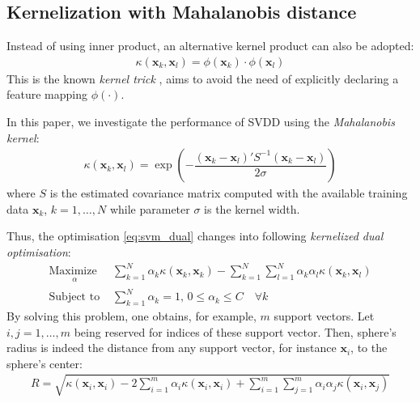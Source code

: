 \documentclass[conference]{IEEEtran}
\theoremstyle{problemstyle}
\begin{document}
\subsection{Kernelization with Mahalanobis distance}

Instead of using inner product, an alternative kernel product can also be adopted:
\begin{align}
\kappa \left( \mathbf{x}_k, \mathbf{x}_l \right) = \phi \left( \mathbf{x}_k \right) \cdot \phi \left( \mathbf{x}_l \right)
\end{align}
This is the known \emph{kernel trick} \cite{Scholkopf2001}, aims to avoid the need of explicitly declaring a feature mapping $\phi \left( \cdot \right)$. 

In this paper, we investigate the performance of SVDD using the \emph{Mahalanobis kernel}:
\begin{align}
\kappa \left( \mathbf{x}_k, \mathbf{x}_l \right) = \exp \left( -\dfrac{ \left( \mathbf{x}_k - \mathbf{x}_l \right)'S^{-1}\left( \mathbf{x}_k - \mathbf{x}_l \right) }{2\sigma} \right)
\end{align}
where $S$ is the estimated covariance matrix computed with the available training data $\mathbf{x}_k$, $k=1,\dots,N$ while parameter $\sigma$ is the kernel width. 

Thus, the optimisation \eqref{eq:svm_dual} changes into following \emph{kernelized dual optimisation}:
\begin{subequations}\label{eq:svm_dual_kernel}
\begin{align}
\underset{
	\begin{array}{c}
		 \alpha
	\end{array}}{\text{Maximize }} &\sum_{k=1}^N \alpha_k \kappa \left( \mathbf{x}_k, \mathbf{x}_k \right)  - \sum_{k=1}^N \sum_{l=1}^N \alpha_k \alpha_l \kappa \left( \mathbf{x}_k, \mathbf{x}_l \right)  \\
\text{Subject to } &\sum_{k=1}^N \alpha_k = 1 \text{, } 0 \le \alpha_k \le C \quad \forall k
\end{align}
\end{subequations}
By solving this problem, one obtains, for example, $m$ support vectors. Let $i, j = 1,\dots,m$ being reserved for indices of these support vector. Then, sphere's radius is indeed the distance from any support vector, for instance $\mathbf{x}_i$, to the sphere's center:
\begin{align}
R = \sqrt{\kappa \left( \mathbf{x}_i, \mathbf{x}_i \right) - 2 \sum_{i=1}^m \alpha_i \kappa \left( \mathbf{x}_i, \mathbf{x}_i \right) + \sum_{i=1}^m \sum_{j=1}^m \alpha_i \alpha_j \kappa \left( \mathbf{x}_i, \mathbf{x}_j \right)}
\end{align}
\end{document}
